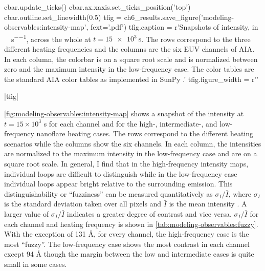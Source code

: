 \begin{pycode}
            cbar.update_ticks()
            cbar.ax.xaxis.set_ticks_position('top')
            cbar.outline.set_linewidth(0.5)
tfig = ch6_results.save_figure('modeling-observables:intensity-map', fext='.pdf')
tfig.caption = r'Snapshots of intensity, in \si{\dn\per\pixel\per\second}, across the whole \AR{} at $t=\SI{15e3}{\second}$. The rows correspond to the three different heating frequencies and the columns are the six EUV channels of AIA. In each column, the colorbar is on a square root scale and is normalized between zero and the maximum intensity in the low-frequency case. The color tables are the standard AIA color tables as implemented in SunPy \citep{sunpy_community_sunpypython_2015}.'
tfig.figure_width = r'\textwidth'
\end{pycode}
|tfig|

\autoref{fig:modeling-observables:intensity-map} shows a snapshot of the intensity at $t=15\times10^3$ s for each channel and for the high-, intermediate-, and low-frequency nanoflare heating cases. The rows correspond to the different heating scenarios while the columns show the six channels. In each column, the intensities are normalized to the maximum intensity in the low-frequency case and are on a square root scale. In general, I find that in the high-frequency intensity maps, individual loops are difficult to distinguish while in the low-frequency case individual loops appear bright relative to the surrounding emission. This distinguishability or ``fuzziness'' can be measured quantitatively as $\sigma_{I}/\bar{I}$, where $\sigma_{I}$ is the standard deviation taken over all pixels and $\bar{I}$ is the mean intensity \citep[Equation 11]{guarrasi_coronal_2010}. A larger value of $\sigma_{I}/\bar{I}$ indicates a greater degree of contrast and vice versa. $\sigma_{I}/\bar{I}$ for each channel and heating frequency is shown in \autoref{tab:modeling-observables:fuzzy}. With the exception of 131 \AA{}, for every channel, the high-frequency case is the most ``fuzzy''. The low-frequency case shows the most contrast in each channel except 94 \AA{} though the margin between the low and intermediate cases is quite small in some cases.

